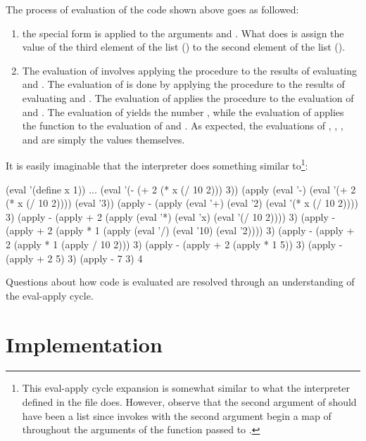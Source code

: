   The process of evaluation of the  code shown above goes as followed:

  \begin{enumerate}
    \item the special form  is applied to the arguments  and . What  does is assign the value of the third element of the list () to the second element of the list ().
    \item The evaluation of  involves applying the procedure \var{-} to the results of evaluating  and . The evaluation of  is done by applying the procedure \var{+} to the results of evaluating  and . The evaluation of  applies the procedure \var{*} to the evaluation of  and . The evaluation of  yields the number , while the evaluation of  applies the function \var{/} to the evaluation of  and . As expected, the evaluations of , , , and  are simply the values themselves.
  \end{enumerate}

  It is easily imaginable that the  interpreter does something similar to\footnote{This eval-apply cycle expansion is somewhat similar to what the interpreter defined in the  file does. However, observe that the second argument of  should have been a list since  invokes  with the second argument begin a map of  throughout the arguments of the function passed to .}:

  \begin{code}
(eval '(define x 1))
...
(eval '(- (+ 2 (* x (/ 10 2))) 3))
(apply (eval '-) (eval '(+ 2 (* x (/ 10 2)))) (eval '3))
(apply - (apply (eval '+) (eval '2) (eval '(* x (/ 10 2)))) 3)
(apply - (apply + 2 (apply (eval '*) (eval 'x) (eval '(/ 10 2)))) 3)
(apply - (apply + 2 (apply * 1 (apply (eval '/) (eval '10) (eval '2)))) 3)
(apply - (apply + 2 (apply * 1 (apply / 10 2))) 3)
(apply - (apply + 2 (apply * 1 5)) 3)
(apply - (apply + 2 5) 3)
(apply - 7 3)
4
  \end{code}

  Questions about how code is evaluated are resolved through an understanding of the eval-apply cycle.

\section{Implementation}
\label{section: Implementation}

